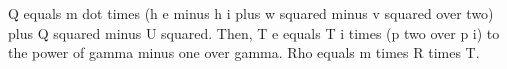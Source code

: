Q equals m dot times (h e minus h i plus w squared minus v squared over two) plus Q squared minus U squared. Then, T e equals T i times (p two over p i) to the power of gamma minus one over gamma. Rho equals m times R times T.
